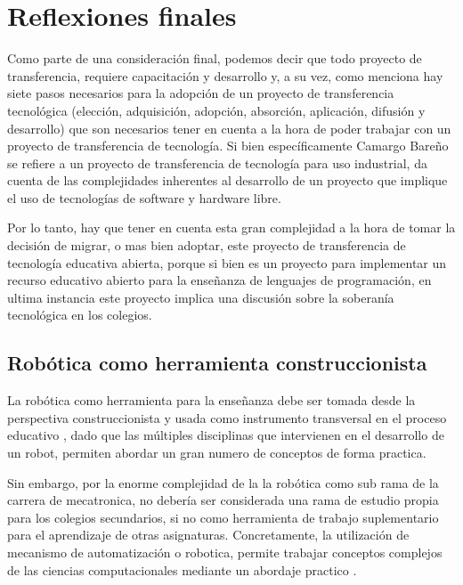 \chapter{Reflexiones finales}

Como parte de una consideración final, podemos decir que todo proyecto de transferencia, requiere capacitación y desarrollo y, a su vez, como menciona \cite{bareno2011metodologia} hay siete pasos necesarios para la adopción de un proyecto de transferencia tecnológica (elección, adquisición, adopción, absorción, aplicación, difusión y desarrollo) que son necesarios tener en cuenta  a la hora de poder trabajar con un proyecto de transferencia de tecnología. Si bien específicamente Camargo Bareño se refiere a un proyecto de transferencia de tecnología para uso industrial, da cuenta de las complejidades inherentes al desarrollo de un proyecto que implique el uso de tecnologías de software y hardware libre.
 
Por lo tanto, hay que tener en cuenta esta gran complejidad a la hora de tomar la decisión de migrar, o mas bien adoptar, este proyecto de transferencia de tecnología educativa abierta, porque si bien es un proyecto para implementar un recurso educativo abierto para la enseñanza de lenguajes de programación, en ultima instancia este proyecto implica una discusión sobre la soberanía tecnológica en los colegios.

 \section{Robótica como herramienta construccionista}
 
 La robótica como herramienta para la enseñanza debe ser tomada desde la perspectiva construccionista \citep{pitti_experiencias_2010} y usada como instrumento transversal en el proceso educativo \citep{seymour_papert_maquina_1995}, dado que las múltiples disciplinas que intervienen en el desarrollo de un robot, permiten abordar un gran numero de conceptos de forma practica.
 
 Sin embargo, por la enorme complejidad de la la robótica \citep{reyes_cortes_robotica:_2011} como  sub rama de la carrera de mecatronica, no debería ser considerada una rama de estudio propia para los colegios secundarios, si no como herramienta de trabajo suplementario para el aprendizaje de otras asignaturas. Concretamente, la utilización de mecanismo de automatización o robotica, permite trabajar conceptos complejos de las ciencias computacionales mediante un abordaje practico \citep{sanchez_robotica_2012}.
 
